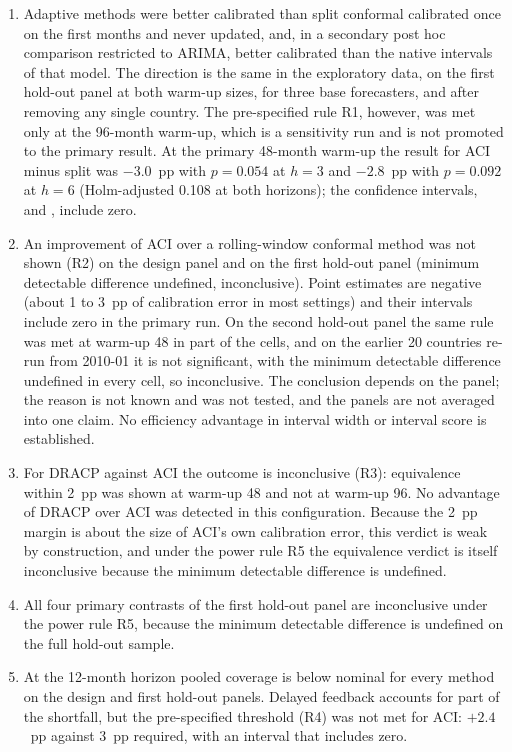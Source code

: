 \begin{enumerate}
\item Adaptive methods were better calibrated than split conformal calibrated once on the first months and never updated, and, in a secondary post hoc comparison restricted to ARIMA, better calibrated than the native intervals of that model. The direction is the same in the exploratory data, on the first hold-out panel at both warm-up sizes, for three base forecasters, and after removing any single country. The pre-specified rule R1, however, was met only at the 96-month warm-up, which is a sensitivity run and is not promoted to the primary result. At the primary 48-month warm-up the result for ACI minus split was $-3.0$~pp with $p=0.054$ at $h=3$ and $-2.8$~pp with $p=0.092$ at $h=6$ (Holm-adjusted 0.108 at both horizons); the confidence intervals,  and , include zero.
\item An improvement of ACI over a rolling-window conformal method was not shown (R2) on the design panel and on the first hold-out panel (minimum detectable difference undefined, inconclusive). Point estimates are negative (about 1 to 3~pp of calibration error in most settings) and their intervals include zero in the primary run. On the second hold-out panel the same rule was met at warm-up 48 in part of the cells, and on the earlier 20 countries re-run from 2010-01 it is not significant, with the minimum detectable difference undefined in every cell, so inconclusive. The conclusion depends on the panel; the reason is not known and was not tested, and the panels are not averaged into one claim. No efficiency advantage in interval width or interval score is established.
\item For DRACP against ACI the outcome is inconclusive (R3): equivalence within 2~pp was shown at warm-up 48 and not at warm-up 96. No advantage of DRACP over ACI was detected in this configuration. Because the 2~pp margin is about the size of ACI's own calibration error, this verdict is weak by construction, and under the power rule R5 the equivalence verdict is itself inconclusive because the minimum detectable difference is undefined.
\item All four primary contrasts of the first hold-out panel are inconclusive under the power rule R5, because the minimum detectable difference is undefined on the full hold-out sample.
\item At the 12-month horizon pooled coverage is below nominal for every method on the design and first hold-out panels. Delayed feedback accounts for part of the shortfall, but the pre-specified threshold (R4) was not met for ACI: $+2.4$~pp against 3~pp required, with an interval that includes zero.

\end{enumerate}
